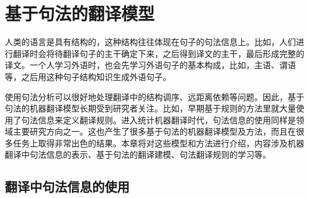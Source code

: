 
%


\renewcommand\figurename{图}%
\renewcommand\tablename{表}%


\chapter{基于句法的翻译模型}

人类的语言是具有结构的，这种结构往往体现在句子的句法信息上。比如，人们进行翻译时会将待翻译句子的主干确定下来，之后得到译文的主干，最后形成完整的译文。一个人学习外语时，也会先学习外语句子的基本构成，比如，主语、谓语等，之后用这种句子结构知识生成外语句子。

使用句法分析可以很好地处理翻译中的结构调序、远距离依赖等问题。因此，基于句法的机器翻译模型长期受到研究者关注。比如，早期基于规则的方法里就大量使用了句法信息来定义翻译规则。进入统计机器翻译时代，句法信息的使用同样是领域主要研究方向之一。这也产生了很多基于句法的机器翻译模型及方法，而且在很多任务上取得非常出色的结果。本章将对这些模型和方法进行介绍，内容涉及机器翻译中句法信息的表示、基于句法的翻译建模、句法翻译规则的学习等。


\section{翻译中句法信息的使用}

